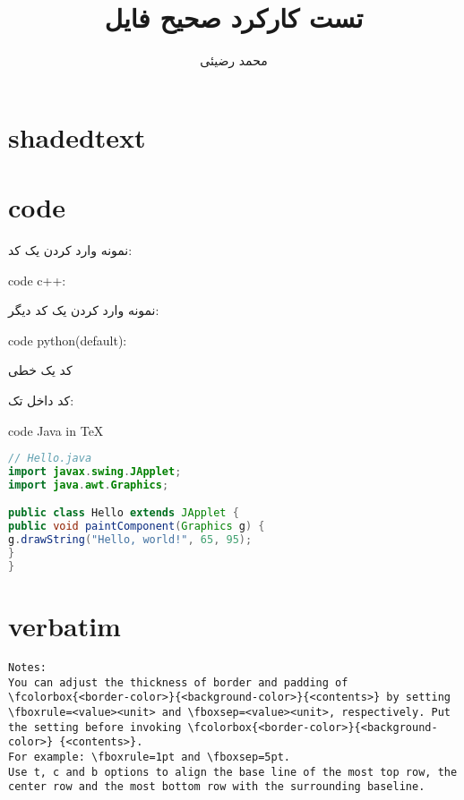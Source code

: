 \documentclass[12pt]{article}
\title{تست کارکرد صحیح فایل}
\author{محمد رضیئی}
\begin{document}
\maketitle

\section{shadedtext}
\ptext[1]
\begin{shadedtext}
	\ptext[1-10]
\end{shadedtext}
\ptext[1]

\section{code}
	نمونه وارد کردن یک کد:
\begin{latin}
\noindent code c++:

\end{latin}	

نمونه وارد کردن یک کد دیگر:
\begin{latin}
\noindent code python(default):

\end{latin}
کد یک خطی

کد داخل تک:
\begin{latin}
\noindent code Java in \TeX
\begin{lstlisting}[language = Java]
// Hello.java
import javax.swing.JApplet;
import java.awt.Graphics;

public class Hello extends JApplet {
public void paintComponent(Graphics g) {
g.drawString("Hello, world!", 65, 95);
}    
}
\end{lstlisting}
\end{latin}

\section{verbatim} %

\begin{latin}	
\begin{Verbatim}[breaklines=true, breakanywhere=true]
Notes:
You can adjust the thickness of border and padding of
\fcolorbox{<border-color>}{<background-color>}{<contents>} by setting \fboxrule=<value><unit> and \fboxsep=<value><unit>, respectively. Put the setting before invoking \fcolorbox{<border-color>}{<background-color>} {<contents>}. 
For example: \fboxrule=1pt and \fboxsep=5pt.
Use t, c and b options to align the base line of the most top row, the center row and the most bottom row with the surrounding baseline.
\end{Verbatim}
\end{latin}
\end{document}
